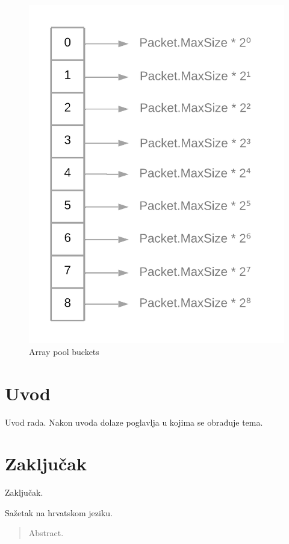 \documentclass[times, utf8, diplomski]{fer}
\begin{document}
\begin{figure}[h!]
	\centering
	\includegraphics[scale=0.2]{Array-pool-buckets}
	\caption{Array pool buckets}
\end{figure}

\chapter{Uvod}
Uvod rada. Nakon uvoda dolaze poglavlja u kojima se obrađuje tema.

\chapter{Zaključak}
Zaključak.




\begin{sazetak}
Sažetak na hrvatskom jeziku.

\end{sazetak}

\begin{abstract}
Abstract.

\end{abstract}
\end{document}
